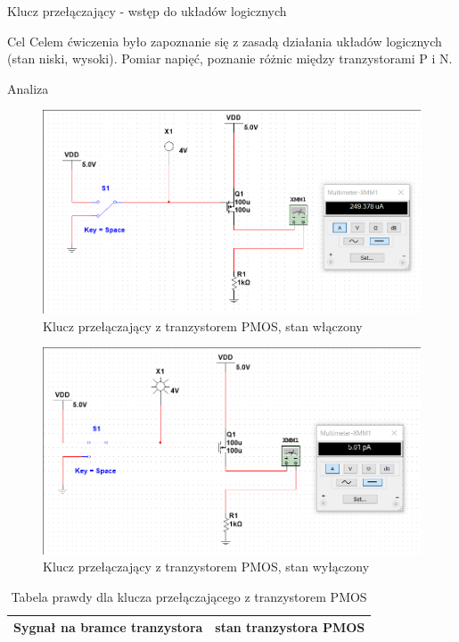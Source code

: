\documentclass[a4paper]{scrartcl}
\begin{document}
	\begin{section}{Klucz przełączający - wstęp do układów logicznych}
		\begin{subsection}{Cel}
			Celem ćwiczenia było zapoznanie się z zasadą działania układów logicznych (stan niski, wysoki). Pomiar napięć, poznanie różnic między tranzystorami P i N.
		\end{subsection}
		\begin{subsection}{Analiza}
				\begin{figure}[ht]
				\begin{center}
					\includegraphics[width=0.65\linewidth]{exercise-6-tranzystor-wstep-circuit-pmos-on}
					\caption{Klucz przełączający z tranzystorem PMOS, stan włączony}
					\label{fig:circuit-4-p-on}
				\end{center}
				\end{figure}
				\begin{figure}[!ht]
				\begin{center}
					\includegraphics[width=0.65\linewidth]{exercise-6-tranzystor-wstep-circuit-pmos-off}
					\caption{Klucz przełączający z tranzystorem PMOS, stan wyłączony}
					\label{fig:circuit-4-p-off}
				\end{center}
				\end{figure}
				\begin{table}[!ht]
					\begin{center}
					\caption{Tabela prawdy dla klucza przełączającego z tranzystorem PMOS}
					\begin{tabular}{| l | l |}
						\hline
						Sygnał na bramce tranzystora & stan tranzystora PMOS \\\hline

\end{tabular}
\end{center}
\end{table}
\end{subsection}
\end{section}
\end{document}

